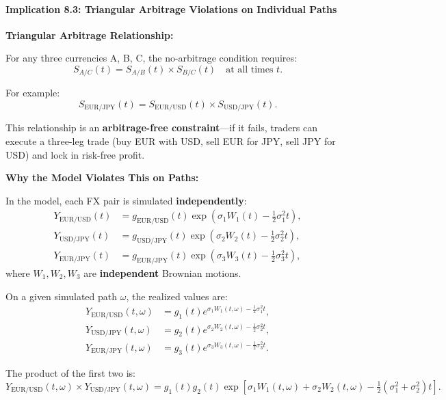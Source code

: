 \paragraph{Implication 8.3: Triangular Arbitrage Violations on Individual Paths}

\textbf{Triangular Arbitrage Relationship:}

For any three currencies A, B, C, the no-arbitrage condition requires:
\begin{equation}
	S_{A/C}(t) = S_{A/B}(t) \times S_{B/C}(t) \quad \text{at all times } t.
\end{equation}

For example:
\begin{equation}
	S_{\text{EUR/JPY}}(t) = S_{\text{EUR/USD}}(t) \times S_{\text{USD/JPY}}(t).
\end{equation}

This relationship is an \textbf{arbitrage-free constraint}—if it fails, traders can execute a three-leg trade (buy EUR with USD, sell EUR for JPY, sell JPY for USD) and lock in risk-free profit.

\textbf{Why the Model Violates This on Paths:}

In the model, each FX pair is simulated \textbf{independently}:
\begin{align}
	Y_{\text{EUR/USD}}(t) &= g_{\text{EUR/USD}}(t) \exp\left(\sigma_1 W_1(t) - \tfrac{1}{2}\sigma_1^2 t\right), \\
	Y_{\text{USD/JPY}}(t) &= g_{\text{USD/JPY}}(t) \exp\left(\sigma_2 W_2(t) - \tfrac{1}{2}\sigma_2^2 t\right), \\
	Y_{\text{EUR/JPY}}(t) &= g_{\text{EUR/JPY}}(t) \exp\left(\sigma_3 W_3(t) - \tfrac{1}{2}\sigma_3^2 t\right),
\end{align}
where $W_1, W_2, W_3$ are \textbf{independent} Brownian motions.

On a given simulated path $\omega$, the realized values are:
\begin{align}
	Y_{\text{EUR/USD}}(t,\omega) &= g_1(t) e^{\sigma_1 W_1(t,\omega) - \frac{1}{2}\sigma_1^2 t}, \\
	Y_{\text{USD/JPY}}(t,\omega) &= g_2(t) e^{\sigma_2 W_2(t,\omega) - \frac{1}{2}\sigma_2^2 t}, \\
	Y_{\text{EUR/JPY}}(t,\omega) &= g_3(t) e^{\sigma_3 W_3(t,\omega) - \frac{1}{2}\sigma_3^2 t}.
\end{align}

The product of the first two is:
\begin{equation}
	Y_{\text{EUR/USD}}(t,\omega) \times Y_{\text{USD/JPY}}(t,\omega) = g_1(t) g_2(t) \exp\left[\sigma_1 W_1(t,\omega) + \sigma_2 W_2(t,\omega) - \tfrac{1}{2}(\sigma_1^2 + \sigma_2^2)t\right].
\end{equation}

